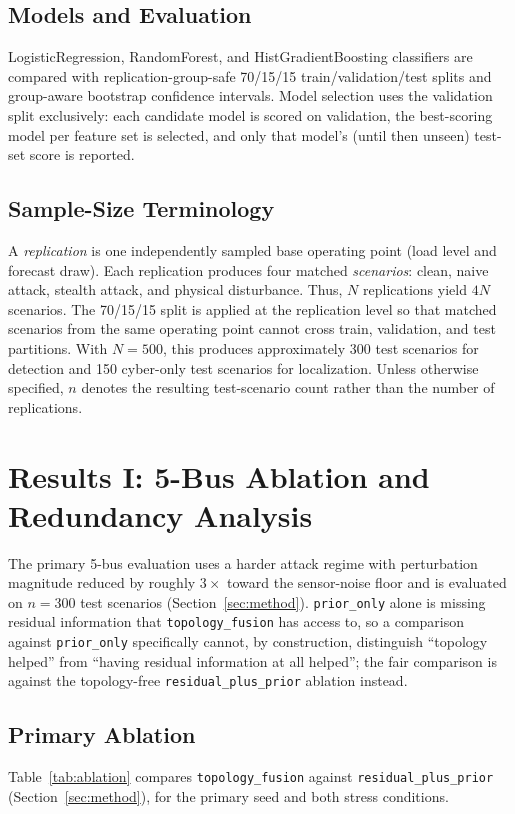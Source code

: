 \documentclass[conference]{IEEEtran}
\begin{document}
\subsection{Models and Evaluation}
LogisticRegression, RandomForest, and HistGradientBoosting classifiers are compared with replication-group-safe 70/15/15 train/validation/test splits and group-aware bootstrap confidence intervals. Model selection uses the validation split exclusively: each candidate model is scored on validation, the best-scoring model per feature set is selected, and only that model's (until then unseen) test-set score is reported.

\subsection{Sample-Size Terminology}
A \emph{replication} is one independently sampled base operating point (load level and forecast draw). Each replication produces four matched \emph{scenarios}: clean, naive attack, stealth attack, and physical disturbance. Thus, $N$ replications yield $4N$ scenarios. The 70/15/15 split is applied at the replication level so that matched scenarios from the same operating point cannot cross train, validation, and test partitions. With $N{=}500$, this produces approximately 300 test scenarios for detection and 150 cyber-only test scenarios for localization. Unless otherwise specified, $n$ denotes the resulting test-scenario count rather than the number of replications.

\section{Results I: 5-Bus Ablation and Redundancy Analysis}
\label{sec:results1}

The primary 5-bus evaluation uses a harder attack regime with perturbation magnitude reduced by roughly $3\times$ toward the sensor-noise floor and is evaluated on $n{=}300$ test scenarios (Section~\ref{sec:method}). \texttt{prior\_only} alone is missing residual information that \texttt{topology\_fusion} has access to, so a comparison against \texttt{prior\_only} specifically cannot, by construction, distinguish ``topology helped'' from ``having residual information at all helped''; the fair comparison is against the topology-free \texttt{residual\_plus\_prior} ablation instead.

\subsection{Primary Ablation}
Table~\ref{tab:ablation} compares \texttt{topology\_fusion} against \texttt{residual\_plus\_prior} (Section~\ref{sec:method}), for the primary seed and both stress conditions.
\end{document}
